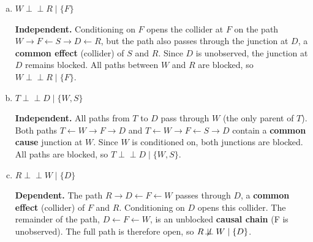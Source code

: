{\begin{enumerate}[(a)]
  \item \points[2] $W \perp\!\!\!\perp R \mid \{F\}$

  \begin{sol}
  \textbf{Independent.} Conditioning on $F$ opens the collider at $F$ on the path $W \to F \leftarrow S \to D \leftarrow R$, but the path also passes through the junction at $D$, a \textbf{common effect} (collider) of $S$ and $R$. Since $D$ is unobserved, the junction at $D$ remains blocked. All paths between $W$ and $R$ are blocked, so $W \perp\!\!\!\perp R \mid \{F\}$.
  \end{sol}

  \item \points[2] $T \perp\!\!\!\perp D \mid \{W, S\}$

  \begin{sol}
  \textbf{Independent.} All paths from $T$ to $D$ pass through $W$ (the only parent of $T$). Both paths $T \leftarrow W \to F \to D$ and $T \leftarrow W \to F \leftarrow S \to D$ contain a \textbf{common cause} junction at $W$. Since $W$ is conditioned on, both junctions are blocked. All paths are blocked, so $T \perp\!\!\!\perp D \mid \{W, S\}$.
  \end{sol}

  \item \points[2] $R \perp\!\!\!\perp W \mid \{D\}$

  \begin{sol}
  \textbf{Dependent.} The path $R \to D \leftarrow F \leftarrow W$ passes through $D$, a \textbf{common effect} (collider) of $F$ and $R$. Conditioning on $D$ opens this collider. The remainder of the path, $D \leftarrow F \leftarrow W$, is an unblocked \textbf{causal chain} (F is unobserved). The full path is therefore open, so $R \not\!\perp\!\!\!\perp W \mid \{D\}$.
  \end{sol}

\end{enumerate}
}

\clearpage

